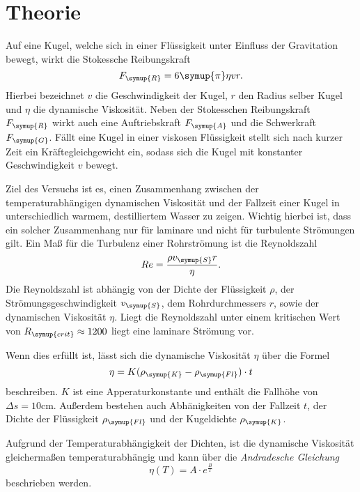 \section{Theorie}
\label{sec:Theorie}
Auf eine Kugel, welche sich in einer Flüssigkeit unter Einfluss der Gravitation bewegt, wirkt die Stokessche Reibungskraft
\begin{equation}
    F_{\symup{R}}=6\symup{\pi}\eta v r.
\end{equation}
Hierbei bezeichnet $v$ die Geschwindigkeit der Kugel, $r$ den Radius selber Kugel und $\eta$ die dynamische Viskosität.
Neben der Stokesschen Reibungskraft $F_{\symup{R}}$ wirkt auch eine Auftriebskraft $F_{\symup{A}}$ und die Schwerkraft $F_{\symup{G}}$.
Fällt eine Kugel in einer viskosen Flüssigkeit stellt sich nach kurzer Zeit ein Kräftegleichgewicht ein, sodass sich die Kugel 
mit konstanter Geschwindigkeit $v$ bewegt.

Ziel des Versuchs ist es, einen Zusammenhang zwischen der temperaturabhängigen dynamischen Viskosität und der Fallzeit einer
Kugel in unterschiedlich warmem, destilliertem Wasser zu zeigen. Wichtig hierbei ist, dass ein solcher Zusammenhang nur für laminare
und nicht für turbulente Strömungen gilt. Ein Maß für die Turbulenz einer Rohrströmung ist die Reynoldszahl
\begin{equation}
    Re=\frac{\rho v_{\symup{S}}r}{\eta}.
    \label{eqn:Reynoldszahl}
\end{equation}
Die Reynoldszahl ist abhängig von der Dichte der Flüssigkeit $\rho$, der Strömungsgeschwindigkeit $v_{\symup{S}}$, dem 
Rohrdurchmessers $r$, sowie der dynamischen Viskosität $\eta$. Liegt die Reynoldszahl unter einem kritischen Wert von
$R_{\symup{crit}}\approx 1200$ \cite[341/B102]{czichos} liegt eine laminare Strömung vor.

Wenn dies erfüllt ist, lässt sich die dynamische Viskosität $\eta$ über die Formel
\begin{equation}
    \eta = K(\rho_{\symup{K}}-\rho_{\symup{Fl}})\cdot t
    \label{eqn:Viskosität}
\end{equation}
beschreiben. $K$ ist eine Apperaturkonstante und enthält die Fallhöhe von $\Delta s=10\unit{\centi\metre}$. Außerdem
bestehen auch Abhänigkeiten von der Fallzeit $t$, der Dichte der Flüssigkeit $\rho_{\symup{Fl}}$ und der Kugeldichte
$\rho_{\symup{K}}$.

Aufgrund der Temperaturabhängigkeit der Dichten, ist die dynamische Viskosität gleichermaßen temperaturabhängig und kann über 
die \textit{Andradesche Gleichung}
\begin{equation}
    \eta (T)=A\cdot e^{\frac{B}{T}}
    \label{eqn:Andradesche Gleichung}
\end{equation}
beschrieben werden.



